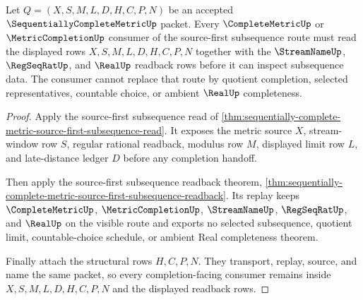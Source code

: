 \begin{theorem}
\label{thm:sequentially-complete-metric-source-first-subsequence-completion-nonescape}
Let $Q=(X,S,M,L,D,H,C,P,N)$ be an accepted $\SequentiallyCompleteMetricUp$ packet. Every $\CompleteMetricUp$ or $\MetricCompletionUp$ consumer of the source-first subsequence route must read the displayed rows $X,S,M,L,D,H,C,P,N$ together with the $\StreamNameUp$, $\RegSeqRatUp$, and $\RealUp$ readback rows before it can inspect subsequence data. The consumer cannot replace that route by quotient completion, selected representatives, countable choice, or ambient $\RealUp$ completeness.
\end{theorem}
\begin{proof}
Apply the source-first subsequence read of \autoref{thm:sequentially-complete-metric-source-first-subsequence-read}. It exposes the metric source $X$, stream-window row $S$, regular rational readback, modulus row $M$, displayed limit row $L$, and late-distance ledger $D$ before any completion handoff.

Then apply the source-first subsequence readback theorem, \autoref{thm:sequentially-complete-metric-source-first-subsequence-readback}. Its replay keeps $\CompleteMetricUp$, $\MetricCompletionUp$, $\StreamNameUp$, $\RegSeqRatUp$, and $\RealUp$ on the visible route and exports no selected subsequence, quotient limit, countable-choice schedule, or ambient Real completeness theorem.

Finally attach the structural rows $H,C,P,N$. They transport, replay, source, and name the same packet, so every completion-facing consumer remains inside $X,S,M,L,D,H,C,P,N$ and the displayed readback rows.
\end{proof}
